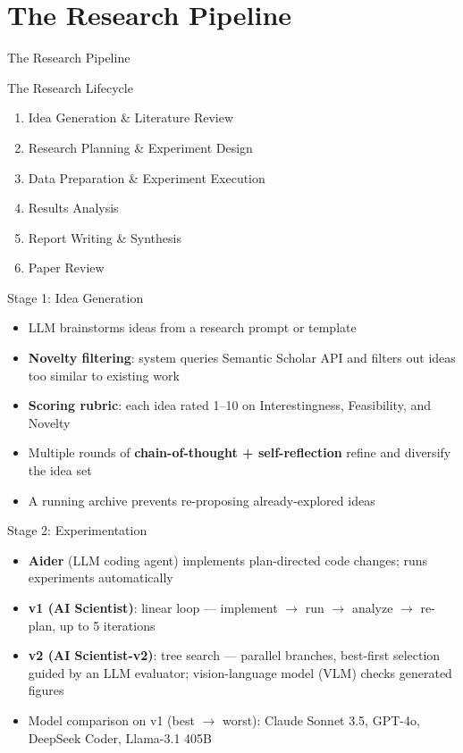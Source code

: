 \documentclass[aspectratio=169]{beamer}
\begin{document}
\section{The Research Pipeline}

\begin{frame}{}
  \centering
  \Large The Research Pipeline
\end{frame}

\begin{frame}{The Research Lifecycle}
  \begin{enumerate}
    \item Idea Generation \& Literature Review
    \item Research Planning \& Experiment Design
    \item Data Preparation \& Experiment Execution
    \item Results Analysis
    \item Report Writing \& Synthesis
    \item Paper Review
  \end{enumerate}
\end{frame}

\begin{frame}{Stage 1: Idea Generation}
  \begin{itemize}
    \item LLM brainstorms ideas from a research prompt or template
    \item \textbf{Novelty filtering}: system queries Semantic Scholar API and filters out ideas too similar to existing work
    \item \textbf{Scoring rubric}: each idea rated 1--10 on Interestingness, Feasibility, and Novelty
    \item Multiple rounds of \textbf{chain-of-thought + self-reflection} refine and diversify the idea set
    \item A running archive prevents re-proposing already-explored ideas
  \end{itemize}
  \vfill
  \footnotesize\citep{lu2024aiscientist}
\end{frame}

\begin{frame}{Stage 2: Experimentation}
  \begin{itemize}
    \item \textbf{Aider} (LLM coding agent) implements plan-directed code changes; runs experiments automatically
    \item \textbf{v1 (AI Scientist)}: linear loop --- implement $\to$ run $\to$ analyze $\to$ re-plan, up to 5 iterations
    \item \textbf{v2 (AI Scientist-v2)}: tree search --- parallel branches, best-first selection guided by an LLM evaluator; vision-language model (VLM) checks generated figures
    \item Model comparison on v1 (best $\to$ worst): Claude Sonnet 3.5, GPT-4o, DeepSeek Coder, Llama-3.1 405B
  \end{itemize}
  \vfill
  \footnotesize\citep{lu2024aiscientist, yamada2025aiscientistv2}
\end{frame}
\end{document}
